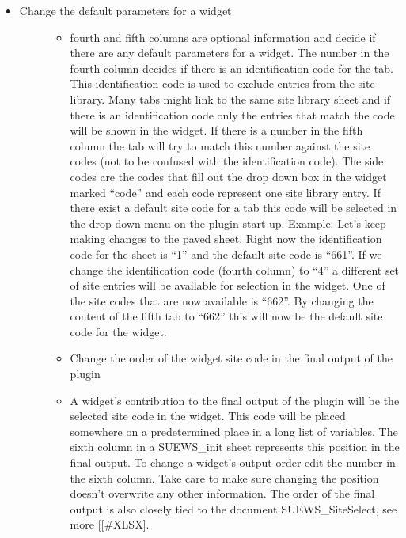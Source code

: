 \documentclass[letterpaper,10pt,english]{sphinxmanual}
\begin{document}
\begin{itemize}
\item {} \begin{description}
\item[{Change the default parameters for a widget}] \leavevmode\begin{itemize}
\item {} 
fourth and fifth columns are optional information and decide if there are any default parameters for a widget. The number in the fourth column decides if there is an identification code for the tab. This identification code is used to exclude entries from the site library. Many tabs might link to the same site library sheet and if there is an identification code only the entries that match the code will be shown in the widget. If there is a number in the fifth column the tab will try to match this number against the site codes (not to be confused with the identification code). The side codes are the codes that fill out the drop down box in the widget marked “code” and each code represent one site library entry. If there exist a default site code for a tab this code will be selected in the drop down menu on the plugin start up. Example: Let’s keep making changes to the paved sheet. Right now the identification code for the sheet is “1” and the default site code is “661”. If we change the identification code (fourth column) to “4” a different set of site entries will be available for selection in the widget. One of the site codes that are now available is “662”. By changing the content of the fifth tab to “662” this will now be the default site code for the widget.   

\end{itemize}
\begin{itemize}
\item {} 
Change the order of the widget site code in the final output of the plugin

\end{itemize}
\begin{itemize}
\item {} 
A widget’s contribution to the final output of the plugin will be the selected site code in the widget. This code will be placed somewhere on a predetermined place in a long list of variables. The sixth column in a SUEWS\_init sheet represents this position in the final output. To change a widget’s output order edit the number in the sixth column. Take care to make sure changing the position doesn’t overwrite any other information. The order of the final output is also closely tied to the document SUEWS\_SiteSelect, see more {[}{[}\#XLSX{]}.


\end{itemize}
\end{description}
\end{itemize}
\end{document}
